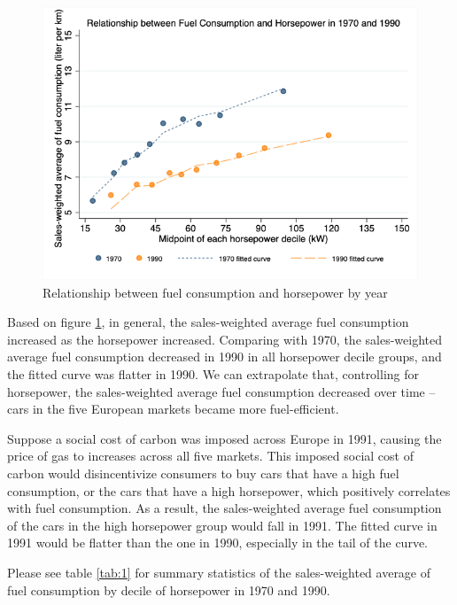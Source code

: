 \documentclass[12pt]{article}
\begin{document}
\begin{figure}[H]
\centering
\caption{Relationship between fuel consumption and horsepower by year \label{fig:1}}
\includegraphics[width = \textwidth]{output/figure/relation_li_hp.png}
\end{figure}

Based on figure \ref{fig:1}, in general, the sales-weighted average fuel consumption increased as the horsepower increased. Comparing with 1970, the sales-weighted average fuel consumption decreased in 1990 in all horsepower decile groups, and the fitted curve was flatter in 1990. We can extrapolate that, controlling for horsepower, the sales-weighted average fuel consumption decreased over time -- cars in the five European markets became more fuel-efficient.

Suppose a social cost of carbon was imposed across Europe in 1991, causing the price of gas to increases across all five markets. This imposed social cost of carbon would disincentivize consumers to buy cars that have a high fuel consumption, or the cars that have a high horsepower, which positively correlates with fuel consumption. As a result, the sales-weighted average fuel consumption of the cars in the high horsepower group would fall in 1991. The fitted curve in 1991 would be flatter than the one in 1990, especially in the tail of the curve.

Please see table \ref{tab:1} for summary statistics of the sales-weighted average of fuel consumption by decile of horsepower in 1970 and 1990.

\begin{table}

\end{table}
\end{document}
